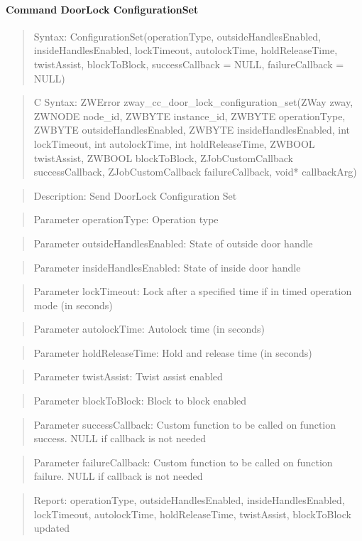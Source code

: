 \paragraph{Command DoorLock ConfigurationSet}
\begin{quote}Syntax: ConfigurationSet(operationType, outsideHandlesEnabled, insideHandlesEnabled, lockTimeout, autolockTime, holdReleaseTime, twistAssist, blockToBlock, successCallback = NULL, failureCallback = NULL)\end{quote}
\begin{quote}C Syntax: ZWError zway\_cc\_door\_lock\_configuration\_set(ZWay zway, ZWNODE node\_id, ZWBYTE instance\_id, ZWBYTE operationType, ZWBYTE outsideHandlesEnabled, ZWBYTE insideHandlesEnabled, int lockTimeout, int autolockTime, int holdReleaseTime, ZWBOOL twistAssist, ZWBOOL blockToBlock, ZJobCustomCallback successCallback, ZJobCustomCallback failureCallback, void* callbackArg)\end{quote}
\begin{quote}Description: Send DoorLock Configuration Set\end{quote}
\begin{quote}Parameter operationType: Operation type\end{quote}
\begin{quote}Parameter outsideHandlesEnabled: State of outside door handle\end{quote}
\begin{quote}Parameter insideHandlesEnabled: State of inside door handle\end{quote}
\begin{quote}Parameter lockTimeout: Lock after a specified time if in timed operation mode (in seconds)\end{quote}
\begin{quote}Parameter autolockTime: Autolock time (in seconds)\end{quote}
\begin{quote}Parameter holdReleaseTime: Hold and release time (in seconds)\end{quote}
\begin{quote}Parameter twistAssist: Twist assist enabled\end{quote}
\begin{quote}Parameter blockToBlock: Block to block enabled\end{quote}
\begin{quote}Parameter successCallback: Custom function to be called on function success. NULL if callback is not needed\end{quote}
\begin{quote}Parameter failureCallback: Custom function to be called on function failure. NULL if callback is not needed\end{quote}
\begin{quote}Report: operationType, outsideHandlesEnabled, insideHandlesEnabled, lockTimeout, autolockTime, holdReleaseTime, twistAssist, blockToBlock updated\end{quote}


